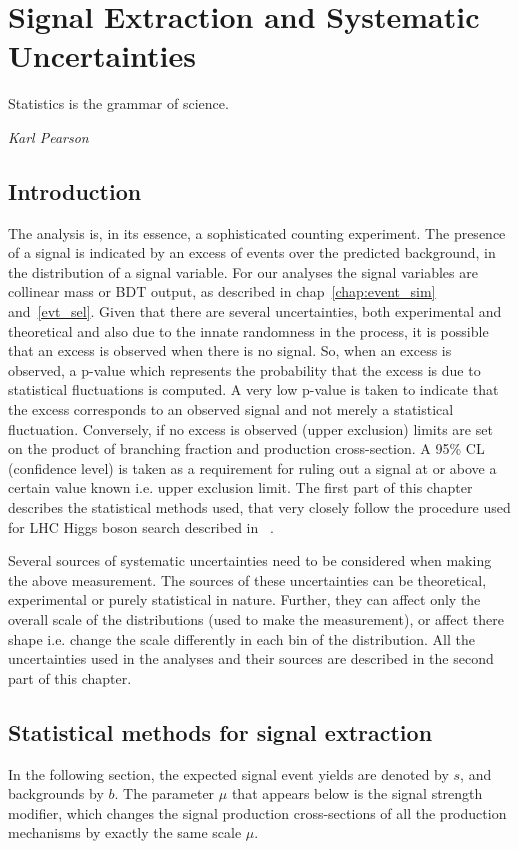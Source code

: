 %
%

\chapter{Signal Extraction and Systematic Uncertainties}
\label{sig_ext}
\epigraph{Statistics is the grammar of science.}{\textit{Karl Pearson}}
\vskip 0.5in
\section{Introduction}
The analysis is, in its essence, a sophisticated counting experiment. The presence of a signal is indicated by an excess of events over the predicted background, in the distribution of a signal variable. For our analyses the signal variables are collinear mass or BDT output, as described in chap~\ref{chap:event_sim} and~\ref{evt_sel}. Given that there are several uncertainties, both experimental and theoretical and also due to the innate randomness in the process, it is possible that an excess is observed when there is no signal. So, when an excess is observed, a p-value which represents the probability that the excess is due to statistical fluctuations is computed. A very low p-value is taken to indicate that the excess corresponds to an observed signal and not merely a statistical fluctuation. Conversely, if no excess is observed (upper exclusion) limits are set on the product of branching fraction and production cross-section. A 95\% CL (confidence level) is taken as a requirement for ruling out a signal at or above a certain value known i.e. upper exclusion limit. The first part of this chapter describes the statistical methods used, that very closely follow the procedure used for LHC Higgs boson search described in ~\cite{note2011}.

Several sources of systematic uncertainties need to be considered when making the above measurement. The sources of these uncertainties can be theoretical, experimental or purely statistical in nature. Further, they can affect only the overall scale of the distributions (used to make the measurement), or affect there shape i.e. change the scale differently in each bin of the distribution. All the uncertainties used in the analyses and their sources are described in the second part of this chapter.      



\section{Statistical methods for signal extraction}
\label{stat_meth}
In the following section, the expected signal event yields are denoted by $s$, and backgrounds by $b$. The parameter $\mu$ that appears below is the signal strength modifier, which changes the signal production cross-sections of all the production mechanisms by exactly the same scale $\mu$.

